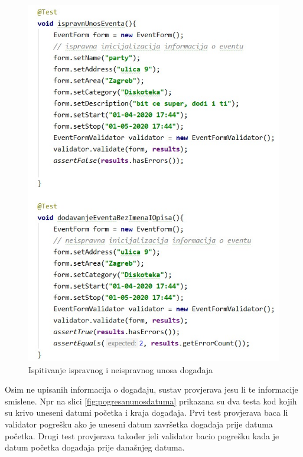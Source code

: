\begin{figure}[H]
	\includegraphics[scale=0.6]{slike/ispitivanje_unosa_dogadaja.jpeg}
	\centering
	\caption{Ispitivanje ispravnog i neispravnog unosa događaja}
	\label{fig:ispitivanjeunosadogadaja}
\end{figure}

\normalfont Osim ne upisanih informacija o događaju, sustav provjerava jesu li te informacije smislene. Npr na slici \ref{fig:pogresanunosdatuma} prikazana su dva testa kod kojih su krivo uneseni datumi početka i kraja događaja. Prvi test provjerava baca li validator pogrešku ako je uneseni datum završetka događaja prije datuma početka. Drugi test provjerava također jeli validator bacio pogrešku kada je datum početka događaja prije današnjeg datuma.

